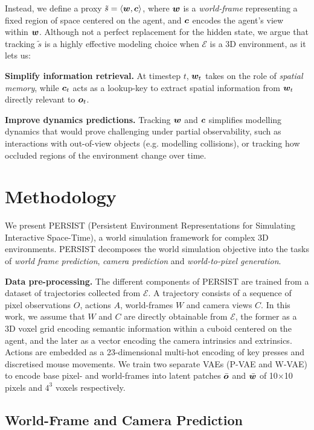 \documentclass{article}
\theoremstyle{plain}
\theoremstyle{definition}
\theoremstyle{remark}
\begin{document}
Instead, we define a proxy $\tilde{s} = \langle {\bm{w}}, {\bm{c}} \rangle$, where ${\bm{w}}$ is a \textit{world-frame} representing a fixed region of space centered on the agent, and ${\bm{c}}$ encodes the agent's view within ${\bm{w}}$.
Although not a perfect replacement for the hidden state, we argue that tracking $\tilde{s}$ is a highly effective modeling choice when $\mathcal{E}$ is a 3D environment, as it lets us:

\textbf{Simplify information retrieval.} At timestep $t$, ${\bm{w}}_t$ takes on the role of \textit{spatial memory}, while ${\bm{c}}_t$ acts as a lookup-key to extract spatial information from ${\bm{w}}_t$ directly relevant to ${\bm{o}}_t$.

\textbf{Improve dynamics predictions.} Tracking ${\bm{w}}$ and ${\bm{c}}$ simplifies modelling dynamics that would prove challenging under partial observability, such as interactions with out-of-view objects (e.g. modelling collisions), or tracking how occluded regions of the environment change over time.

\section{Methodology}
We present PERSIST (Persistent Environment Representations for Simulating Interactive Space-Time), a world simulation framework for complex 3D environments.
PERSIST decomposes the world simulation objective into the tasks of \textit{world frame prediction}, \textit{camera prediction} and \textit{world-to-pixel generation}.

\textbf{Data pre-processing.} The different components of PERSIST are trained from a dataset of trajectories collected from $\mathcal{E}$.
A trajectory consists of a sequence of pixel observations $O$, actions $A$, world-frames $W$ and camera views $C$.
In this work, we assume that $W$ and $C$ are directly obtainable from $\mathcal{E}$, the former as a 3D voxel grid encoding semantic information within a cuboid centered on the agent, and the later as a vector encoding the camera intrinsics and extrinsics.
Actions are embedded as a 23-dimensional multi-hot encoding of key presses and discretised mouse movements.
We train two separate VAEs (P-VAE and W-VAE) to encode base pixel- and world-frames into latent patches $\bar{{\bm{o}}}$ and $\bar{{\bm{w}}}$ of 10$\times$10 pixels and $4^3$ voxels respectively. 

\subsection{World-Frame and Camera Prediction}
\end{document}

